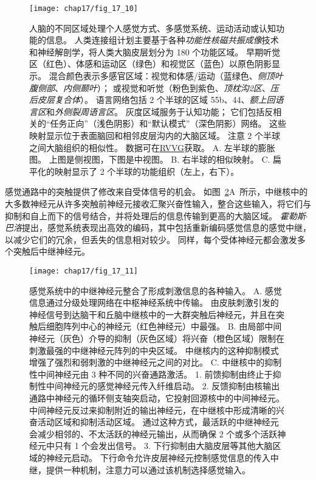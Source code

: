 \begin{figure}[htbp]
	\centering
	\texttt{[image: chap17/fig\_17\_10]}
	\caption{人脑的不同区域处理个人感觉方式、多感觉系统、运动活动或认知功能的信息。
		人类连接组计划主要基于各种\textit{功能性核磁共振成像}技术和神经解剖学，将人类大脑皮层划分为 180 个功能区域。
		早期听觉区（红色）、体感和运动区（绿色）和视觉区（蓝色）以原色阴影显示。
		混合颜色表示多感官区域：视觉和体感/运动（蓝绿色、\textit{侧顶叶腹侧部}、\textit{内侧颞叶}）；
		或视觉和听觉（粉色到紫色、\textit{顶枕沟2区}、\textit{压后皮层复合体}）。
		语言网络包括 2 个半球的区域 55b、44、\textit{额上回语言区}和\textit{外侧裂周语言区}。
		灰度区域服务于认知功能；
		它们包括反相关的“任务正向”（浅色阴影）和“默认模式”（深色阴影）网络。
		这些映射显示位于表面脑回和相邻皮层沟内的大脑区域。
		注意 2 个半球之间大脑组织的相似性\cite{glasser2016multi}。
		数据可在\href{https://balsa.wustl.edu/study/RVVG}{RVVG}获取。
		A. 左半球的膨胀图。 
		上图是侧视图，下图是中视图。
		B. 右半球的相似映射。
		C. 扁平化的映射显示了 2 个半球的功能组织（左上，右下）。}
	\label{fig:17_10}
\end{figure}


感觉通路中的突触提供了修改来自受体信号的机会。
如图~\ref{fig:17_11}A~所示，中继核中的大多数神经元从许多突触前神经元接收汇聚兴奋性输入，整合这些输入，将它们与抑制和自上而下的信号结合，并将处理后的信息传输到更高的大脑区域。
\textit{霍勒斯$\cdot$巴洛}提出，感觉系统表现出高效的编码，其中包括重新编码感觉信息的感觉中继，以减少它们的冗余，但丢失的信息相对较少。 
同样，每个受体神经元都会激发多个突触后中继神经元。


\begin{figure}[htbp]
	\centering
	\texttt{[image: chap17/fig\_17\_11]}
	\caption{感觉系统中的中继神经元整合了形成刺激信息的各种输入。 
		A. 感觉信息通过分级处理网络在中枢神经系统中传输。 
		由皮肤刺激引发的神经信号到达脑干和丘脑中继核中的一大群突触后神经元，并且在突触后细胞阵列中心的神经元（红色神经元）中最强\cite{biederman2013human}。
		B. 由局部中间神经元（灰色）介导的抑制（灰色区域）将兴奋（橙色区域）限制在刺激最强的中继神经元阵列的中央区域。 
		中继核内的这种抑制模式增强了强烈和弱刺激的中继神经元之间的对比。 
		C. 中继核中的抑制性中间神经元由 3 种不同的兴奋通路激活。
		1. 前馈抑制由终止于抑制性中间神经元的感觉神经元传入纤维启动。
		2. 反馈抑制由核输出通路中神经元的循环侧支轴突启动，它投射回源核中的中间神经元。
		中间神经元反过来抑制附近的输出神经元，在中继核中形成清晰的兴奋活动区域和抑制活动区域。
		通过这种方式，最活跃的中继神经元会减少相邻的、不太活跃的神经元输出，从而确保 2 个或多个活跃神经元中只有 1 个会发出信号。
		3. 下行抑制由大脑皮层等其他大脑区域的神经元启动。
		下行命令允许皮层神经元控制感觉信息的传入中继，提供一种机制，注意力可以通过该机制选择感觉输入。}
	\label{fig:17_11}
\end{figure}


